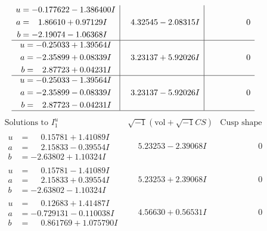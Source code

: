 \documentclass[1p]{elsarticle_modified}
\theoremstyle{definition}
\newcommand{\I}{\sqrt{-1}}
\begin{document}
$$\begin{array}{c|c|c}
\begin{aligned}
u &= -0.177622 - 1.386400 I \\
a &= \phantom{-}1.86610 + 0.97129 I \\
b &= -2.19074 - 1.06368 I\end{aligned}
 & \phantom{-}4.32545 - 2.08315 I & \phantom{-0.000000 } 0 \\ \hline\begin{aligned}
u &= -0.25033 + 1.39564 I \\
a &= -2.35899 + 0.08339 I \\
b &= \phantom{-}2.87723 + 0.04231 I\end{aligned}
 & \phantom{-}3.23137 + 5.92026 I & \phantom{-0.000000 } 0 \\ \hline\begin{aligned}
u &= -0.25033 - 1.39564 I \\
a &= -2.35899 - 0.08339 I \\
b &= \phantom{-}2.87723 - 0.04231 I\end{aligned}
 & \phantom{-}3.23137 - 5.92026 I & \phantom{-0.000000 } 0\\
 \hline 
 \end{array}$$\newpage$$\begin{array}{c|c|c}  
\text{Solutions to }I^u_{1}& \I (\text{vol} + \sqrt{-1}CS) & \text{Cusp shape}\\
 \hline 
\begin{aligned}
u &= \phantom{-}0.15781 + 1.41089 I \\
a &= \phantom{-}2.15833 - 0.39554 I \\
b &= -2.63802 + 1.10324 I\end{aligned}
 & \phantom{-}5.23253 - 2.39068 I & \phantom{-0.000000 } 0 \\ \hline\begin{aligned}
u &= \phantom{-}0.15781 - 1.41089 I \\
a &= \phantom{-}2.15833 + 0.39554 I \\
b &= -2.63802 - 1.10324 I\end{aligned}
 & \phantom{-}5.23253 + 2.39068 I & \phantom{-0.000000 } 0 \\ \hline\begin{aligned}
u &= \phantom{-}0.12683 + 1.41487 I \\
a &= -0.729131 - 0.110038 I \\
b &= \phantom{-}0.861769 + 1.075790 I\end{aligned}
 & \phantom{-}4.56630 + 0.56531 I & \phantom{-0.000000 } 0 \\ \hline\begin{aligned}

\end{aligned}
\end{array}$$
\end{document}
